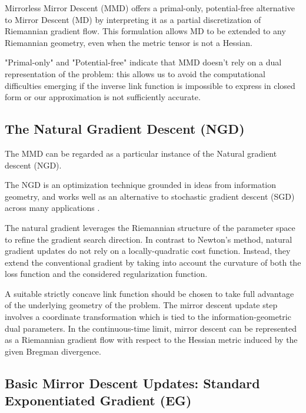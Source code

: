 \documentclass[10pt]{amsart}
\theoremstyle{definition}
\theoremstyle{definition}	 %
\begin{document}
Mirrorless Mirror Descent (MMD) offers a primal-only, potential-free alternative to Mirror Descent (MD) by interpreting it as a partial discretization of Riemannian gradient flow. This formulation allows MD to be extended to any Riemannian geometry, even when the metric tensor is not a Hessian.

"Primal-only" and  "Potential-free"  indicate that MMD doesn't rely on a dual representation of the problem: this allows us to avoid the computational difficulties emerging if the inverse link function  is impossible to express in closed form or our approximation is not sufficiently accurate.



\subsection{The Natural Gradient Descent (NGD)}
The MMD can be regarded as a particular instance of the Natural gradient descent (NGD).

The NGD is an optimization technique grounded in ideas from  information geometry, and works well as an alternative to  stochastic gradient descent (SGD) across many applications \cite{Amari-98}.

The natural gradient leverages the Riemannian structure of the parameter space to refine the gradient search direction. In contrast to Newton's method, natural gradient updates do not rely on a locally-quadratic cost function.  Instead, they extend the conventional gradient by taking into account the curvature of both the loss function and the considered regularization function.

A suitable strictly concave link  function should be chosen to take full advantage of the underlying geometry of the problem. The mirror descent update step involves a coordinate transformation which is tied to the information-geometric dual parameters. In the continuous-time limit, mirror descent can be represented as a Riemannian gradient flow with respect to the Hessian metric induced by the given Bregman divergence.




\subsection {Basic Mirror Descent Updates: Standard Exponentiated  Gradient (EG)}
\end{document}
